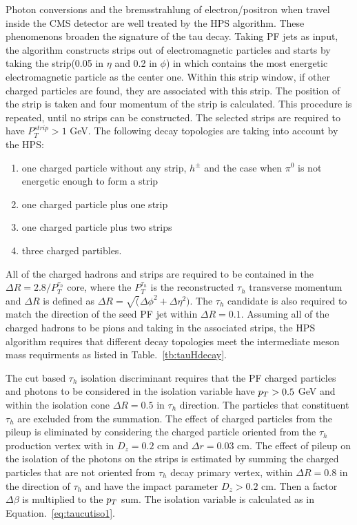 Photon conversions and the bremsstrahlung of electron/positron when travel inside the CMS detector are well treated by the HPS algorithm. These phenomenons broaden the signature of the tau decay. Taking PF jets as input, the algorithm constructs strips out of electromagnetic particles and starts by taking the strip(0.05 in $\eta$ and 0.2 in $\phi$) in which contains the most energetic electromagnetic particle as the center one. Within this strip window, if other charged particles are found, they are associated with this strip. The position of the strip is taken and four momentum of the strip is calculated. This procedure is repeated, until no strips can be constructed. The selected strips are required to have $P_{T}^{strip}>1$ GeV. The following decay topologies are taking into account by the HPS:
\begin{enumerate}[$\bullet$]
\item one charged particle without any strip, $h^{\pm}$ and the case when $\pi^{0}$ is not energetic enough to form a strip
\item one charged particle plus one strip
\item one charged particle plus two strips
\item three charged partibles. 
\end{enumerate} 

All of the charged hadrons and strips are required to be contained in the $\Delta R=2.8/P_{T}^{\tau_{h}}$ core, where the $P_{T}^{\tau_{h}}$ is the reconstructed $\tau_{h}$ transverse momentum and $\Delta R$ is defined as $\Delta R=\sqrt(\Delta \phi^{2}+\Delta \eta^{2})$. The $\tau_{h}$ candidate is also required to match the direction of the seed PF jet within $\Delta R=0.1$. Assuming all of the charged hadrons to be pions and taking in the associated strips, the HPS algorithm requires that different decay topologies meet the intermediate meson mass requirments as listed in Table.~\ref{tb:tauHdecay}. 

The cut based $\tau_{h}$ isolation discriminant requires that the PF charged particles and photons to be considered in the isolation variable have $p_{T}>0.5$ GeV and within the isolation cone  $\Delta R=0.5$ in $\tau_{h}$ direction. The particles that  constituent $\tau_{h}$ are excluded from the summation. The effect of charged particles from the pileup is eliminated by considering the charged particle oriented from the $\tau_{h}$ production vertex with in $D_{z}=0.2$ cm and $\Delta r=0.03$ cm. The effect of pileup on the isolation of the photons on the strips is estimated by summing the charged particles that are not oriented from $\tau_{h}$ decay primary vertex, within $\Delta R=0.8$ in the direction of $\tau_{h}$ and have the impact parameter $D_{z}>0.2$ cm. Then a factor $\Delta \beta$ is multiplied to the $p_{T}$ sum. The isolation variable is calculated as in Equation.~\ref{eq:taucutiso1}.

